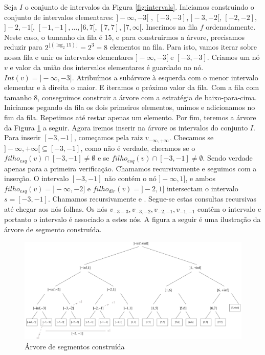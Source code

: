 Seja $I$ o conjunto de intervalos da Figura \ref{fig:intervals}. Iniciamos construindo o conjunto de intervalos elementares: $]-\infty, -3[$ , $[-3, -3]$, $]-3, -2[$, $[-2,-2]$, $]-2, -1[$, $[-1, -1],\dots, ]6, 7[$, $[7,7]$, $]7, \infty [$. Inserimos na fila $f$ ordenadamente. Neste caso, o tamanho da fila é $15$, e para construirmos a árvore, precisamos reduzir para $2^{\lfloor(\log_2{15})\rfloor} = 2^3 = 8$ elementos na fila. Para isto, vamos iterar sobre nossa fila e unir os intervalos elementares $]-\infty, -3[$ e $[-3, -3]$. Criamos um nó $v$ e valor da união dos intervalos elementares é guardado no nó. $Int(v) = ]-\infty, -3]$. Atribuímos a subárvore à esquerda com o menor intervalo elementar e à direita o maior. E iteramos o próximo valor da fila.
Com a fila com tamanho $8$, conseguimos construir a árvore com a estratégia de baixo-para-cima. Iniciamos pegando da fila os dois primeiros elementos, unimos e adicionamos no fim da fila. Repetimos até restar apenas um elemento. Por fim, teremos a árvore da Figura \ref{fig:segment_tree2} a seguir.
Agora iremos inserir na árvore os intervalos do conjunto $I$. Para inserir $[-3, -1]$, começamos pela raiz $v_{-\infty, +\infty}$. Checamos se $ ]-\infty, +\infty[ \subseteq [-3, -1] $, como não é verdade, checamos se o $filho_{esq}(v) \cap [-3,-1] \neq \emptyset$ e se $filho_{esq}(v) \cap [-3,-1]\neq \emptyset$. Sendo verdade apenas para a primeira verificação. Chamamos recursivamente  e seguimos com a inserção. O intervalo $[-3,-1]$ não contém o  nó $]-\infty, 1]$, e ambos $filho_{esq}(v) = ]-\infty, -2] $ e $filho_{dir}(v) = ]-2, 1]$ intersectam o intervalo $s = [-3, -1]$. Chamamos recursivamente  e . Segue-se estas consultas recursivas até chegar aos nós folhas. Os nós $v_{-3 -3}, v_{-3, -2}, v_{-2, -1}, v_{-1, -1}$ contêm o intervalo e portanto o intervalo é associado a estes nós.
A figura a seguir é uma ilustração da  árvore de segmento construída.
\begin{figure}[h!]
     \centering
     \includegraphics[scale=0.5]{images/arvore_seg.pdf}
     \caption{Árvore de segmentos construída}
     \label{fig:segment_tree2}
 \end{figure}

